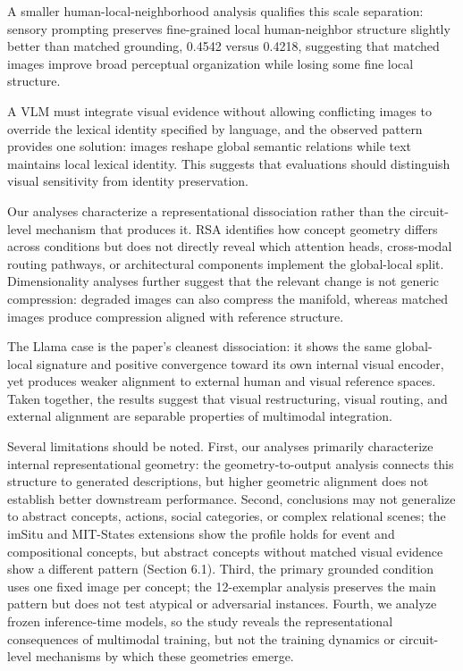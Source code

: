 \documentclass{article}
\begin{document}
A smaller human-local-neighborhood analysis qualifies this scale separation: sensory prompting preserves fine-grained local human-neighbor structure slightly better than matched grounding, 0.4542 versus 0.4218, suggesting that matched images improve broad perceptual organization while losing some fine local structure.

A VLM must integrate visual evidence without allowing conflicting images to override the lexical identity specified by language, and the observed pattern provides one solution: images reshape global semantic relations while text maintains local lexical identity. This suggests that evaluations should distinguish visual sensitivity from identity preservation.

Our analyses characterize a representational dissociation rather than the circuit-level mechanism that produces it. RSA identifies how concept geometry differs across conditions but does not directly reveal which attention heads, cross-modal routing pathways, or architectural components implement the global-local split. Dimensionality analyses further suggest that the relevant change is not generic compression: degraded images can also compress the manifold, whereas matched images produce compression aligned with reference structure.

The Llama case is the paper's cleanest dissociation: it shows the same global-local signature and positive convergence toward its own internal visual encoder, yet produces weaker alignment to external human and visual reference spaces. Taken together, the results suggest that visual restructuring, visual routing, and external alignment are separable properties of multimodal integration.

Several limitations should be noted. First, our analyses primarily characterize internal representational geometry: the geometry-to-output analysis connects this structure to generated descriptions, but higher geometric alignment does not establish better downstream performance. Second, conclusions may not generalize to abstract concepts, actions, social categories, or complex relational scenes; the imSitu and MIT-States extensions show the profile holds for event and compositional concepts, but abstract concepts without matched visual evidence show a different pattern (Section 6.1). Third, the primary grounded condition uses one fixed image per concept; the 12-exemplar analysis preserves the main pattern but does not test atypical or adversarial instances. Fourth, we analyze frozen inference-time models, so the study reveals the representational consequences of multimodal training, but not the training dynamics or circuit-level mechanisms by which these geometries emerge.
\end{document}
